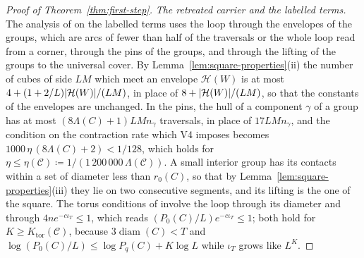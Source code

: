 \documentclass[11pt]{preprint}
\newcommand{\diam}{\operatorname{diam}}
\DeclarePairedDelimiter{\abs}{\lvert}{\rvert}
\numberwithin{equation}{section}
\theoremstyle{definition}
\theoremstyle{remark}
\theoremstyle{plain}
\begin{document}
\begin{proof}[Proof of Theorem~\ref{thm:first-step}]
\emph{The retreated carrier and the labelled terms.} The analysis of \cite[Section~9]{WilsonFirstStep} on the labelled terms uses the loop through the envelopes of the groups, which are arcs of fewer than half of the traversals or the whole loop read from a corner, through the pins of the groups, and through the lifting of the groups to the universal cover. By Lemma~\ref{lem:square-properties}(ii) the number of cubes of side $LM$ which meet an envelope $\mathcal H(W)$ is at most $4 + (1 + 2/L)\abs{\mathcal H(W)}/(LM)$, in place of $8 + \abs{\mathcal H(W)}/(LM)$, so that the constants of the envelopes are unchanged. In the pins, the hull of a component $\gamma$ of a group has at most $(8\Lambda(C) + 1)LMn_\gamma$ traversals, in place of $17LMn_\gamma$, and the condition on the contraction rate which V4 imposes becomes $1000\,\eta\,(8\Lambda(C) + 2) < 1/128$, which holds for $\eta \leq \eta(\mathcal C) \coloneqq 1/(1\,200\,000\,\Lambda(\mathcal C))$. A small interior group has its contacts within a set of diameter less than $r_0(C)$, so that by Lemma~\ref{lem:square-properties}(iii) they lie on two consecutive segments, and its lifting is the one of the square. The torus conditions of \cite{WilsonFirstStep} involve the loop through its diameter and through $4ne^{-c\iota_T} \leq 1$, which reads $(P_0(C)/L)e^{-c\iota_T} \leq 1$; both hold for $K \geq K_{\mathrm{tor}}(\mathcal C)$, because $3\diam(C) < T$ and $\log(P_0(C)/L) \leq \log P_q(C) + K\log L$ while $\iota_T$ grows like $L^K$.


\end{proof}
\end{document}
